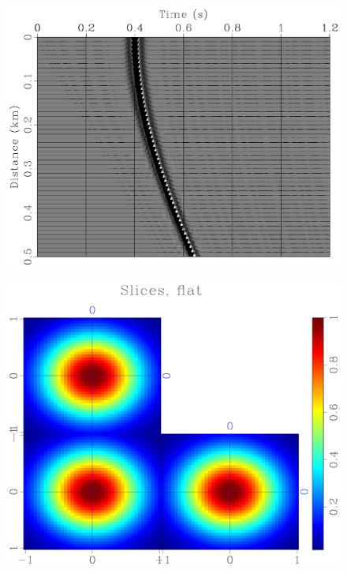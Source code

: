 \begin{frame}
  \begin{figure}
  \includegraphics[scale=0.25]{plot/Fig/sgath.pdf}
  \end{figure}
\end{frame}

\begin{frame}
  \begin{figure}
  \includegraphics[scale=0.25]{plot/Fig/fganom.pdf}
  \end{figure}
\end{frame}

